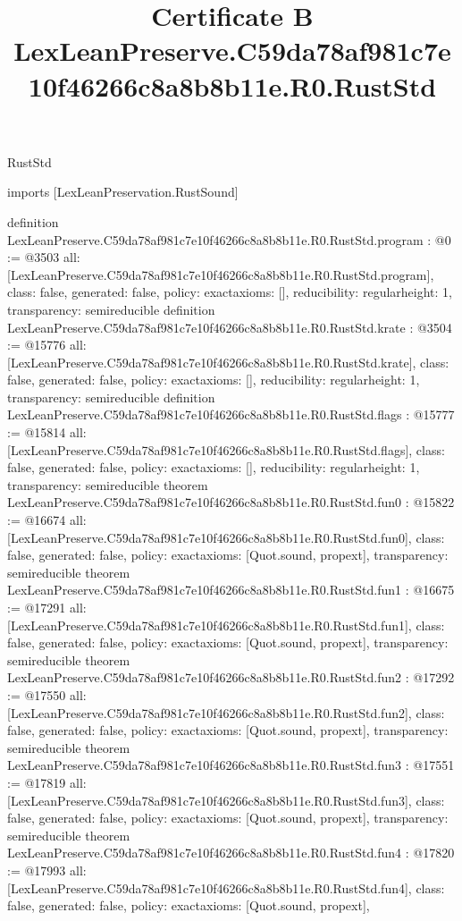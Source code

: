 \begin{lexlean}{RustStd}
\title{Certificate B LexLeanPreserve.C59da78af981c7e10f46266c8a8b8b11e.R0.RustStd}
\begin{coremodule}
imports [LexLeanPreservation.RustSound]

definition LexLeanPreserve.C59da78af981c7e10f46266c8a8b8b11e.R0.RustStd.program : @0 := @3503 {
  all: [LexLeanPreserve.C59da78af981c7e10f46266c8a8b8b11e.R0.RustStd.program],
  class: false,
  generated: false,
  policy: exact{axioms: []},
  reducibility: regular{height: 1},
  transparency: semireducible
}
definition LexLeanPreserve.C59da78af981c7e10f46266c8a8b8b11e.R0.RustStd.krate : @3504 := @15776 {
  all: [LexLeanPreserve.C59da78af981c7e10f46266c8a8b8b11e.R0.RustStd.krate],
  class: false,
  generated: false,
  policy: exact{axioms: []},
  reducibility: regular{height: 1},
  transparency: semireducible
}
definition LexLeanPreserve.C59da78af981c7e10f46266c8a8b8b11e.R0.RustStd.flags : @15777 := @15814 {
  all: [LexLeanPreserve.C59da78af981c7e10f46266c8a8b8b11e.R0.RustStd.flags],
  class: false,
  generated: false,
  policy: exact{axioms: []},
  reducibility: regular{height: 1},
  transparency: semireducible
}
theorem LexLeanPreserve.C59da78af981c7e10f46266c8a8b8b11e.R0.RustStd.fun0 : @15822 := @16674 {
  all: [LexLeanPreserve.C59da78af981c7e10f46266c8a8b8b11e.R0.RustStd.fun0],
  class: false,
  generated: false,
  policy: exact{axioms: [Quot.sound, propext]},
  transparency: semireducible
}
theorem LexLeanPreserve.C59da78af981c7e10f46266c8a8b8b11e.R0.RustStd.fun1 : @16675 := @17291 {
  all: [LexLeanPreserve.C59da78af981c7e10f46266c8a8b8b11e.R0.RustStd.fun1],
  class: false,
  generated: false,
  policy: exact{axioms: [Quot.sound, propext]},
  transparency: semireducible
}
theorem LexLeanPreserve.C59da78af981c7e10f46266c8a8b8b11e.R0.RustStd.fun2 : @17292 := @17550 {
  all: [LexLeanPreserve.C59da78af981c7e10f46266c8a8b8b11e.R0.RustStd.fun2],
  class: false,
  generated: false,
  policy: exact{axioms: [Quot.sound, propext]},
  transparency: semireducible
}
theorem LexLeanPreserve.C59da78af981c7e10f46266c8a8b8b11e.R0.RustStd.fun3 : @17551 := @17819 {
  all: [LexLeanPreserve.C59da78af981c7e10f46266c8a8b8b11e.R0.RustStd.fun3],
  class: false,
  generated: false,
  policy: exact{axioms: [Quot.sound, propext]},
  transparency: semireducible
}
theorem LexLeanPreserve.C59da78af981c7e10f46266c8a8b8b11e.R0.RustStd.fun4 : @17820 := @17993 {
  all: [LexLeanPreserve.C59da78af981c7e10f46266c8a8b8b11e.R0.RustStd.fun4],
  class: false,
  generated: false,
  policy: exact{axioms: [Quot.sound, propext]},
}
\end{coremodule}
\end{lexlean}
